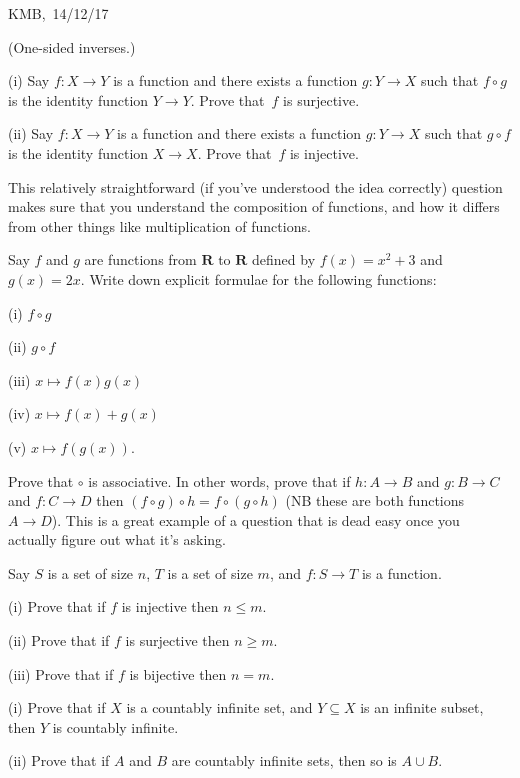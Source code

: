 \documentclass[10pt]{article}
\newcommand{\R}{\mathbf{R}}
\begin{document}
\begin{flushright} KMB,\ 14/12/17\end{flushright}


\medskip{} (One-sided inverses.)

(i) Say $f:X\to Y$ is a function and there exists a function $g:Y\to X$ such that $f\circ g$ is the identity function $Y\to Y$. Prove that~$f$ is surjective. 

(ii) Say $f:X\to Y$ is a function and there exists a function $g:Y\to X$ such that $g\circ f$ is the identity function $X\to X$. Prove that~$f$ is injective.

\medskip{} This relatively straightforward (if you've understood the idea correctly) question makes sure that you understand the composition of functions, and how it differs from other things like multiplication of functions.

Say $f$ and $g$ are functions from $\R$ to $\R$ defined by $f(x)=x^2+3$ and $g(x)=2x$. Write down explicit formulae for the following functions:

(i) $f\circ g$

(ii) $g\circ f$

(iii) $x\mapsto f(x)g(x)$

(iv) $x\mapsto f(x)+g(x)$

(v) $x\mapsto f(g(x))$.

\medskip{} Prove that $\circ$ is associative. In other words, prove that if $h:A\to B$ and $g:B\to C$ and $f:C\to D$ then $(f\circ g)\circ h=f\circ(g\circ h)$ (NB these are both functions $A\to D$). This is a great example of a question that is dead easy once you actually figure out what it's asking.

\medskip{} Say $S$ is a set of size $n$, $T$ is a set of size $m$, and $f:S\to T$ is a function.

(i) Prove that if $f$ is injective then $n\leq m$.

(ii) Prove that if $f$ is surjective then $n\geq m$.

(iii) Prove that if $f$ is bijective then $n=m$.

\medskip{} 
(i) Prove that if $X$ is a countably infinite set, and $Y\subseteq X$ is an infinite subset, then $Y$ is countably infinite.

(ii) Prove that if $A$ and $B$ are countably infinite sets, then so is $A\cup B$.
\end{document}
